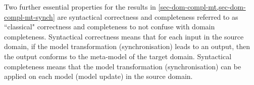 Two further essential properties for the results in \cref{sec-dom-compl-mt,sec-dom-compl-mt-synch} are syntactical correctness and completeness referred to as ``classical" correctness and completeness to not confuse with domain completeness.
Syntactical correctness means that for each input in the source domain, if the model transformation (synchronisation) leads to an output, then the output conforms to the meta-model of the target domain.
Syntactical completeness means that the model transformation (synchronisation) can be applied on each model (model update) in the source domain.

